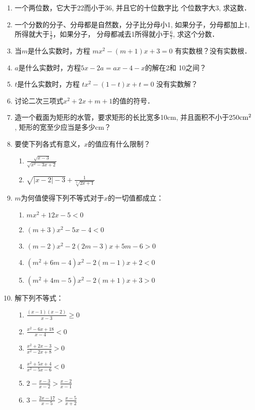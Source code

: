 \begin{enumerate}
\item 一个两位数，它大于22而小于36, 并且它的十位数字比
个位数字大3, 求这数．
\item 一个分数的分子、分母都是自然数，分子比分母小1,
如果分子，分母都加上1, 所得就大于$\frac{1}{2}$，如果分子，
分母都减去1所得就小于$\frac{6}{7}$, 求这个分数．
\item 当$m$是什么实数时，方程
$mx^2-(m+1)x+3=0$
有实数根？没有实数根．
\item $a$是什么实数时，方程$5x-2a=ax-4-x$的解在2和
10之间？
\item $t$是什么实数时，方程
$tx^2-(1-t)x+t=0$
没有实数解？
\item 讨论二次三项式$x^2+2x+m+1$的值的符号．
\item 造一个截面为矩形的水管，要求矩形的长比宽多10cm, 
并且面积不小于250${\rm cm}^2$, 矩形的宽至少应当是多少cm？
\item 要使下列各式有意义，$x$的值应有什么限制？
\begin{enumerate}
    \item $\frac{\sqrt{x-3}}{\sqrt{x^2-3x+2}}$
    \item $\sqrt{|x-2|-3}+\frac{1}{\sqrt[3]{2x+1}}$
\end{enumerate}
\item $m$为何值使得下列不等式对于$x$的一切值都成立：
\begin{enumerate}
    \item $mx^2+12x-5<0$
    \item $(m+3)x^2-5x-4<0$
    \item $(m-2)x^2-2(2m-3)x+5m-6>0$
    \item $(m^2+6m-4)x^2-2(m-1)x+2<0$
    \item $(m^2+4m-5)x^2-2(m+1)x+3>0$
\end{enumerate}

\item 解下列不等式：
\begin{multicols}{2}
\begin{enumerate}
    \item $\frac{(x-1)(x-2)}{x-3}\ge 0$
    \item $\frac{x^2-6x+18}{x-4}<0$
    \item $\frac{x^2+2x-3}{x^2-2x+8}>0$
    \item $\frac{x^2+5x+4}{x^2-5x-6}<0$
    \item $2-\frac{x-3}{x-2}>\frac{x-2}{x-1}$
    \item $3-\frac{2x-17}{x-5}>\frac{x-5}{x+2}$
\end{enumerate}
\end{multicols}

\end{enumerate}







